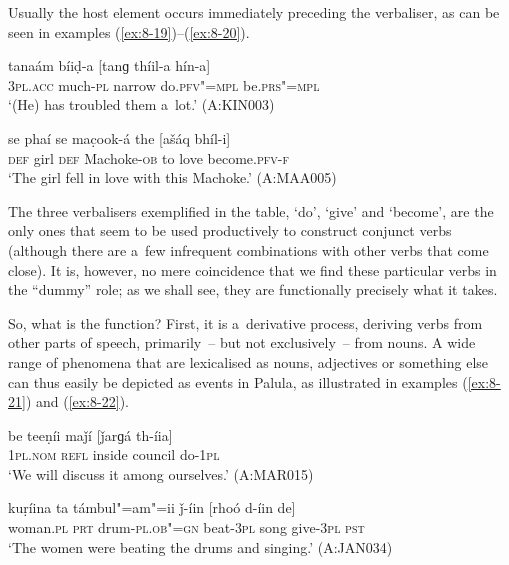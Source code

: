 Usually the host element occurs immediately preceding the verbaliser, as can be seen in examples (\ref{ex:8-19})--(\ref{ex:8-20}).

\begin{exe}
\ex
\label{ex:8-19}
\gll tanaám bíiḍ-a [tanɡ thíil-a hín-a] \\
\textsc{3pl.acc} much-\textsc{pl} narrow do.\textsc{pfv"=mpl} be.\textsc{prs"=mpl} \\
\glt `(He) has troubled them a~lot.' (A:KIN003)
\end{exe}
\begin{exe}
\ex
\label{ex:8-20}
\gll se phaí se mac̣ook-á the [ašáq bhíl-i] \\
\textsc{def} girl \textsc{def} Machoke-\textsc{ob} to  love become.\textsc{pfv-f} \\
\glt `The girl fell in love with this Machoke.' (A:MAA005)
\end{exe}

The three verbalisers exemplified in the table, `do', `give' and `become', are the only ones that seem to be used productively to construct conjunct verbs (although there are a~few infrequent combinations with other verbs that come close). It is, however, no mere coincidence that we find these particular verbs in the ``dummy'' role; as we shall see, they are functionally precisely what it takes. 


So, what is the function? First, it is a~derivative process, deriving verbs from other parts of speech, primarily~-- but not exclusively~-- from nouns. A wide range of phenomena that are lexicalised as nouns, adjectives or something else can thus easily be depicted as events in Palula, as illustrated in examples (\ref{ex:8-21}) and (\ref{ex:8-22}). 

\begin{exe}
\ex
\label{ex:8-21}
\gll be teeṇíi maǰí [ǰarɡá th-íia] \\
\textsc{1}\textsc{pl.nom} \textsc{refl} inside council do-\textsc{1pl} \\
\glt `We will discuss it among ourselves.' (A:MAR015)
\end{exe}
\begin{exe}
\ex
\label{ex:8-22}
\gll kuṛíina ta támbul"=am"=ii ǰ-íin [rhoó d-íin de] \\
woman.\textsc{pl} \textsc{prt} drum-\textsc{pl.ob"=gn} beat-\textsc{3pl} song give-\textsc{3pl}
\textsc{pst} \\
\glt `The women were beating the drums and singing.' (A:JAN034)
\end{exe}

